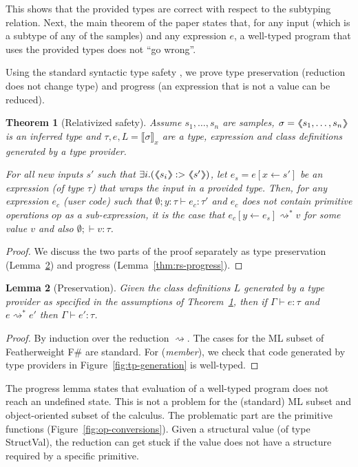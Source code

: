 \documentclass[10pt,preprint,blind,clearpagebib]{sigplanconf}
\newcommand{\langl}{\begin{picture}(4.5,7)
\put(1.1,2.5){\rotatebox{60}{\line(1,0){5.5}}}
\put(1.1,2.5){\rotatebox{300}{\line(1,0){5.5}}}
\end{picture}}
\newcommand{\rangl}{\begin{picture}(4.5,7)
\put(.9,2.5){\rotatebox{120}{\line(1,0){5.5}}}
\put(.9,2.5){\rotatebox{240}{\line(1,0){5.5}}}
\end{picture}}
\newcommand{\llangl}{\langl\hspace{-0.35em}\langl}
\newcommand{\rrangl}{\rangl\hspace{-0.35em}\rangl}
\newcommand{\ident}[1]{\textnormal{\sffamily #1}}
\newcommand{\reduce}{\rightsquigarrow}
\newcommand{\sem}[1]{\llbracket #1 \rrbracket}
\newcommand{\semalt}[1]{\llangl #1 \rrangl}
\newtheorem{theorem}{Theorem}
\newtheorem{lemma}[theorem]{Lemma}
\begin{document}
\noindent
This shows that the provided types are correct with respect to the subtyping relation. Next, the
main theorem of the paper states that, for any input (which is a subtype of any of the samples) and 
any expression $e$, a well-typed program that uses the provided types does not ``go wrong''.

Using the standard syntactic type safety  \cite{syntactic}, we prove type preservation 
(reduction does not change type) and progress (an expression that is not a value can be reduced).

\begin{theorem}[Relativized safety]
\label{thm:safety}
Assume $s_1, \ldots, s_n$ are samples, $\sigma=\semalt{s_1, \ldots, s_n}$ is an inferred
type and $\tau,e,L = \sem{\sigma}_x$ are a type, expression and class definitions generated by a 
type provider.

For all new inputs $s'$ such that $\exists i.(\semalt{s_i} :> \semalt{s'})$, let $e_s=e[x\leftarrow s']$
be an expression (of type $\tau$) that wraps the input in a provided type. Then, for any expression $e_c$
(user code) such that $\emptyset; y:\tau \vdash e_c:\tau'$ and $e_c$ does not contain primitive operations
$op$ as a sub-expression, it is the case that $e_c[y\leftarrow e_s] \reduce^{*} v$ for some value $v$ and
also $\emptyset; \vdash v : \tau$.
\end{theorem}
\begin{proof}
We discuss the two parts of the proof separately as type preservation (Lemma~\ref{thm:rs-preservation})
and progress (Lemma~\ref{thm:rs-progress}).
\end{proof}

\begin{lemma}[Preservation]
\label{thm:rs-preservation}
Given the class definitions $L$ generated by a type provider as specified in
the assumptions of Theorem~\ref{thm:safety}, then if $\Gamma \vdash e : \tau$ and 
$e \reduce^{*} e'$ then $\Gamma \vdash e' : \tau$.
\end{lemma}
\begin{proof}
By induction over the reduction $\reduce$. The cases for the ML subset of Featherweight F\# 
are standard. For (\emph{member}), we check that code generated by type providers
in Figure~\ref{fig:tp-generation} is well-typed.
\end{proof}

\noindent
The progress lemma states that evaluation of a well-typed program does not reach an undefined state. 
This is not a problem for the (standard) ML subset and object-oriented subset of the calculus. The 
problematic part are the primitive functions (Figure~\ref{fig:op-conversions}). Given a structural 
value (of type \ident{StructVal}), the reduction can get stuck if the value does not have a structure 
required by a specific primitive.
\end{document}
